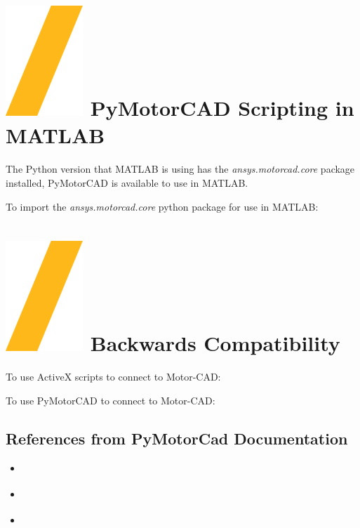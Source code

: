 \documentclass[landscape]{article}
\begin{document}
\begin{multicols}{3}
\section{\includegraphics[height=\fontcharht\font`\S]{slash.png} PyMotorCAD Scripting in MATLAB}
The Python version that MATLAB is using has the \textit{ansys.motorcad.core} package installed, PyMotorCAD is available to use in MATLAB.

To import the \textit{ansys.motorcad.core} python package for use in MATLAB:

\section{\includegraphics[height=\fontcharht\font`\S]{slash.png} Backwards Compatibility}
To use ActiveX scripts to connect to Motor-CAD:

To use PyMotorCAD to connect to Motor-CAD:

\subsection{References from PyMotorCad Documentation}
\begin{center}
\begin{itemize}
\item \href{https://motorcad.docs.pyansys.com/version/stable/getting_started/index.html}{\color{blue}{Getting Started}}
\item \href{https://motorcad.docs.pyansys.com/version/stable/examples/index.html}{\color{blue}{Examples}}
\item \href{https://motorcad.docs.pyansys.com/version/stable/methods/index.html}{\color{blue}{API Reference}}
\end{itemize}
\end{center}
\end{multicols}
\end{document}
